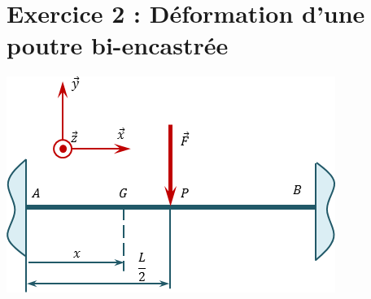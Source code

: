 \documentclass[10pt,fleqn]{article} %
\begin{document}
\section*{Exercice 2 : Déformation d'une poutre bi-encastrée}

\begin{center}
\includegraphics[width=.48\linewidth]{images/fig_04}
\end{center}
\end{document}
